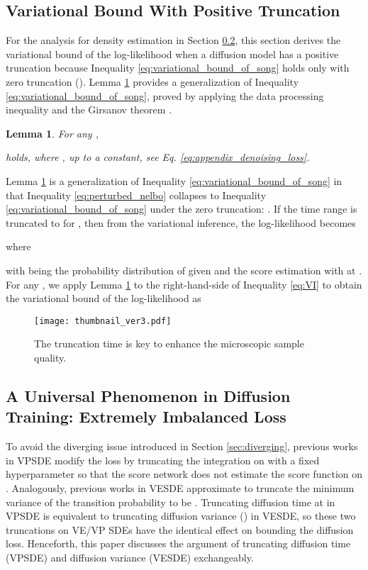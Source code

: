 \documentclass[nohyperref]{article}
\theoremstyle{plain}
\newtheorem{lemma}{Lemma}
\theoremstyle{definition}
\theoremstyle{remark}
\begin{document}
\subsection{Variational Bound With Positive Truncation}

For the analysis for density estimation in Section \ref{sec:universal}, this section derives the variational bound of the log-likelihood when a diffusion model has a positive truncation because Inequality \eqref{eq:variational_bound_of_song} holds only with zero truncation (). Lemma \ref{lemma:1} provides a generalization of Inequality \eqref{eq:variational_bound_of_song}, proved by applying the data processing inequality \cite{gerchinovitz2020fano} and the Girsanov theorem \cite{pavon1991free,vargas2021solving,song2021maximum}.
\begin{lemma}\label{lemma:1}
For any ,

holds, where , up to a constant, see Eq. \eqref{eq:appendix_denoising_loss}. 
\end{lemma}

Lemma \ref{lemma:1} is a generalization of Inequality \eqref{eq:variational_bound_of_song} in that Inequality \eqref{eq:perturbed_nelbo} collapses to Inequality \eqref{eq:variational_bound_of_song} under the zero truncation: . If the time range is truncated to  for , then from the variational inference, the log-likelihood becomes 

where

with  being the probability distribution of  given  and the score estimation with  at . For any , we apply Lemma \ref{lemma:1} to the right-hand-side of Inequality \eqref{eq:VI} to obtain the variational bound of the log-likelihood as 


\begin{figure}[t]
\vskip -0.2in
\centering
\texttt{[image: thumbnail\_ver3.pdf]}
\caption{The truncation time is key to enhance the microscopic sample quality.}
\label{fig:truncation_variance}
\end{figure}

\subsection{A Universal Phenomenon in Diffusion Training: Extremely Imbalanced Loss}\label{sec:universal}

To avoid the diverging issue introduced in Section \ref{sec:diverging}, previous works in VPSDE \cite{song2021maximum, vahdat2021score} modify the loss by truncating the integration on  with a fixed hyperparameter  so that the score network does not estimate the score function on . Analogously, previous works in VESDE \cite{song2020score, chen2021likelihood} approximate  to truncate the minimum variance of the transition probability to be . Truncating diffusion time at  in VPSDE is equivalent to truncating diffusion variance () in VESDE, so these two truncations on VE/VP SDEs have the identical effect on bounding the diffusion loss. Henceforth, this paper discusses the argument of truncating diffusion time (VPSDE) and diffusion variance (VESDE) exchangeably. 
\end{document}
